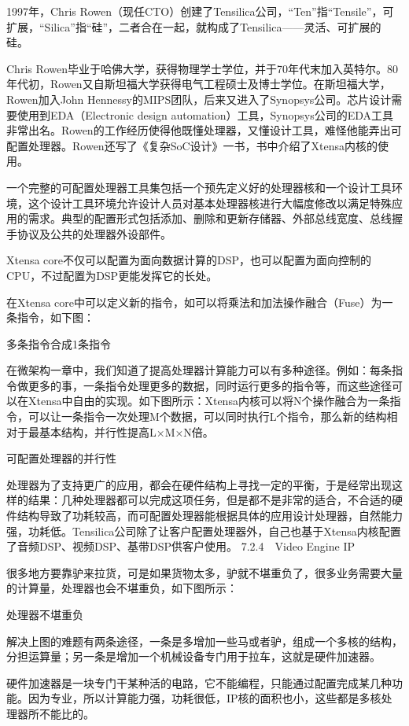 \documentclass[12pt,UTF8]{ctexbook}
\begin{document}
1997年，Chris Rowen（现任CTO）创建了Tensilica公司，“Ten”指“Tensile”，可扩展，“Silica”指“硅”，二者合在一起，就构成了Tensilica——灵活、可扩展的硅。

Chris Rowen毕业于哈佛大学，获得物理学士学位，并于70年代末加入英特尔。80年代初，Rowen又自斯坦福大学获得电气工程硕士及博士学位。在斯坦福大学，Rowen加入John Hennessy的MIPS团队，后来又进入了Synopsys公司。芯片设计需要使用到EDA（Electronic design automation）工具，Synopsys公司的EDA工具非常出名。Rowen的工作经历使得他既懂处理器，又懂设计工具，难怪他能弄出可配置处理器。Rowen还写了《复杂SoC设计》一书，书中介绍了Xtensa内核的使用。

一个完整的可配置处理器工具集包括一个预先定义好的处理器核和一个设计工具环境，这个设计工具环境允许设计人员对基本处理器核进行大幅度修改以满足特殊应用的需求。典型的配置形式包括添加、删除和更新存储器、外部总线宽度、总线握手协议及公共的处理器外设部件。

Xtensa core不仅可以配置为面向数据计算的DSP，也可以配置为面向控制的CPU，不过配置为DSP更能发挥它的长处。

在Xtensa core中可以定义新的指令，如可以将乘法和加法操作融合（Fuse）为一条指令，如下图：

多条指令合成1条指令

在微架构一章中，我们知道了提高处理器计算能力可以有多种途径。例如：每条指令做更多的事，一条指令处理更多的数据，同时运行更多的指令等，而这些途径可以在Xtensa中自由的实现。如下图所示：Xtensa内核可以将N个操作融合为一条指令，可以让一条指令一次处理M个数据，可以同时执行L个指令，那么新的结构相对于最基本结构，并行性提高L×M×N倍。

可配置处理器的并行性

处理器为了支持更广的应用，都会在硬件结构上寻找一定的平衡，于是经常出现这样的结果：几种处理器都可以完成这项任务，但是都不是非常的适合，不合适的硬件结构导致了功耗较高，而可配置处理器能根据具体的应用设计处理器，自然能力强，功耗低。Tensilica公司除了让客户配置处理器外，自己也基于Xtensa内核配置了音频DSP、视频DSP、基带DSP供客户使用。
7.2.4　Video Engine IP

很多地方要靠驴来拉货，可是如果货物太多，驴就不堪重负了，很多业务需要大量的计算量，处理器也会不堪重负，如下图所示：

处理器不堪重负

解决上图的难题有两条途径，一条是多增加一些马或者驴，组成一个多核的结构，分担运算量；另一条是增加一个机械设备专门用于拉车，这就是硬件加速器。

硬件加速器是一块专门干某种活的电路，它不能编程，只能通过配置完成某几种功能。因为专业，所以计算能力强，功耗很低，IP核的面积也小，这些都是多核处理器所不能比的。
\end{document}
